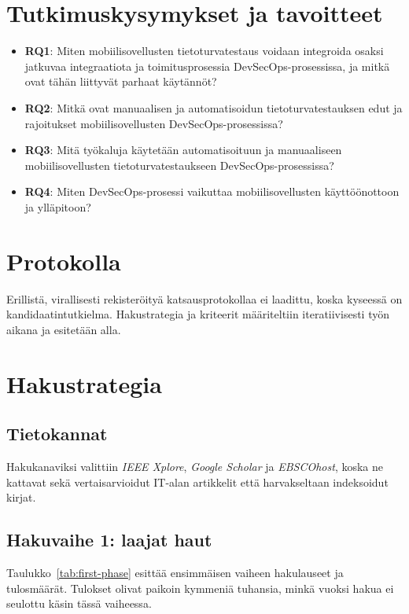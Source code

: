\documentclass[bscthesis,finnish,oneside,biblatex]{uefcsthesis}
\begin{document}
\section{Tutkimuskysymykset ja tavoitteet}
\label{sec:rq}
\begin{itemize}
  \item \textbf{RQ1}: Miten mobiilisovellusten tietoturvatestaus voidaan integroida osaksi jatkuvaa integraatiota ja toimitusprosessia DevSecOps-prosessissa, ja mitkä ovat tähän liittyvät parhaat käytännöt?
  \item \textbf{RQ2}: Mitkä ovat manuaalisen ja automatisoidun tietoturvatestauksen edut ja rajoitukset mobiilisovellusten DevSecOps-prosessissa?
  \item \textbf{RQ3}: Mitä työkaluja käytetään automatisoituun ja manuaaliseen mobiilisovellusten tietoturvatestaukseen DevSecOps-prosessissa?
  \item \textbf{RQ4}: Miten DevSecOps-prosessi vaikuttaa mobiilisovellusten käyttöönottoon ja ylläpitoon?
\end{itemize}

\section{Protokolla}
\label{sec:protocol}

Erillistä, virallisesti rekisteröityä katsausprotokollaa ei laadittu,
koska kyseessä on kandidaatintutkielma. Hakustrategia ja kriteerit
määriteltiin iteratiivisesti työn aikana ja esitetään alla.


\section{Hakustrategia}
\label{sec:search-strategy}

\subsection{Tietokannat}
Hakukanaviksi valittiin \emph{IEEE Xplore}, \emph{Google Scholar}
ja \emph{EBSCOhost}, koska ne kattavat sekä vertaisarvioidut
IT-alan artikkelit että harvakseltaan indeksoidut kirjat.

\subsection{Hakuvaihe 1: laajat haut}
Taulukko~\ref{tab:first-phase} esittää ensimmäisen vaiheen
hakulauseet ja tulosmäärät. Tulokset olivat paikoin kymmeniä tuhansia,
minkä vuoksi hakua ei seulottu käsin tässä vaiheessa.
\end{document}
